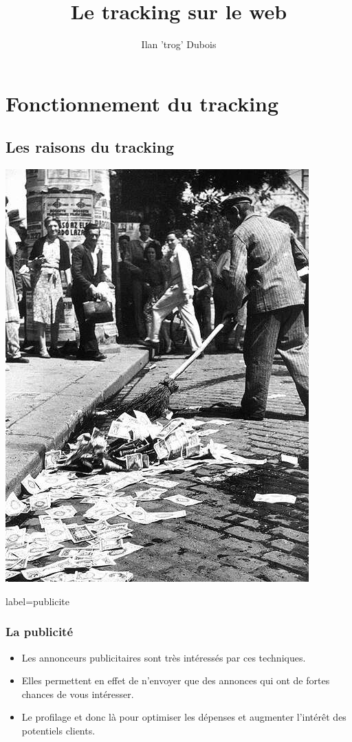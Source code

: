 \documentclass{beamer}
\title{Le tracking sur le web}
\author{Ilan 'trog' Dubois}
\begin{document}
    \begin{frame}
        \titlepage
    \end{frame}
    \section{Fonctionnement du tracking}
    \subsection{Les raisons du tracking}
        \begin{frame}
            \begin{center}
                \includegraphics[scale=0.75]{img/money.jpg}
            \end{center}
        \end{frame}
        \begin{frame}{label=publicite}
            \frametitle{La publicité}
            \begin{center}
                \begin{itemize}
                    \item Les annonceurs publicitaires sont très intéressés par ces techniques.
                    \pause
                    \item Elles permettent en effet de n'envoyer que des annonces qui ont de fortes chances de vous intéresser.
                    \pause
                    \item Le profilage et donc là pour optimiser les dépenses et augmenter l'intérêt des potentiels clients.
                \end{itemize}
            \end{center}
        \end{frame}
\end{document}
